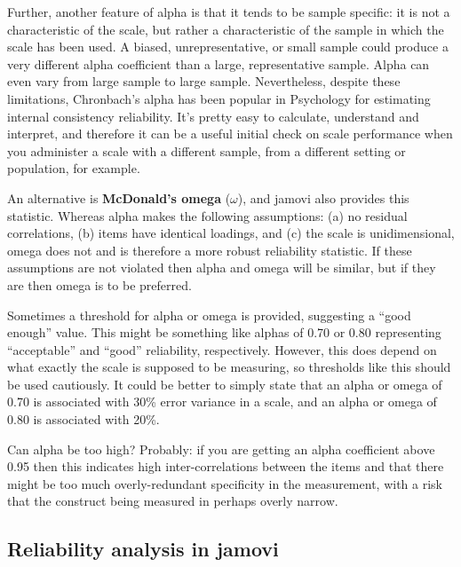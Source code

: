 \documentclass[
]{book}
\begin{document}
Further, another feature of alpha is that it tends to be sample specific: it is not a characteristic of the scale, but rather a characteristic of the sample in which the scale has been used. A biased, unrepresentative, or small sample could produce a very different alpha coefficient than a large, representative sample. Alpha can even vary from large sample to large sample. Nevertheless, despite these limitations, Chronbach's alpha has been popular in Psychology for estimating internal consistency reliability. It's pretty easy to calculate, understand and interpret, and therefore it can be a useful initial check on scale performance when you administer a scale with a different sample, from a different setting or population, for example.

An alternative is {\textbf{McDonald's omega}} (\(\omega\)), and jamovi also provides this statistic. Whereas alpha makes the following assumptions: (a) no residual correlations, (b) items have identical loadings, and (c) the scale is unidimensional, omega does not and is therefore a more robust reliability statistic. If these assumptions are not violated then alpha and omega will be similar, but if they are then omega is to be preferred.

Sometimes a threshold for alpha or omega is provided, suggesting a ``good enough'' value. This might be something like alphas of 0.70 or 0.80 representing ``acceptable'' and ``good'' reliability, respectively. However, this does depend on what exactly the scale is supposed to be measuring, so thresholds like this should be used cautiously. It could be better to simply state that an alpha or omega of 0.70 is associated with 30\% error variance in a scale, and an alpha or omega of 0.80 is associated with 20\%.

Can alpha be too high? Probably: if you are getting an alpha coefficient above 0.95 then this indicates high inter-correlations between the items and that there might be too much overly-redundant specificity in the measurement, with a risk that the construct being measured in perhaps overly narrow.

\hypertarget{reliability-analysis-in-jamovi}{%
\subsection{Reliability analysis in jamovi}\label{reliability-analysis-in-jamovi}}
\end{document}
